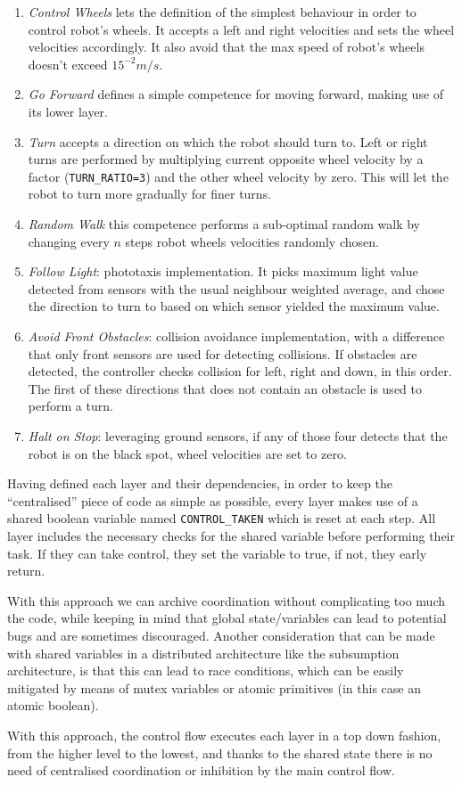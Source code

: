 \begin{enumerate}
    \item \emph{Control Wheels} lets the definition of the simplest behaviour
        in order to control robot's wheels. It accepts a left and right
        velocities and sets the wheel velocities accordingly. It also avoid
        that the max speed of robot's wheels doesn't exceed $15^{-2}m/s$.
    \item \emph{Go Forward} defines a simple competence for moving forward,
        making use of its lower layer.
    \item \emph{Turn} accepts a direction on which the robot should turn to.
        Left or right turns are performed by multiplying current opposite wheel
        velocity by a factor (\texttt{TURN\_RATIO=3}) and the other wheel velocity by zero.
        This will let the robot to turn more gradually for finer turns.
    \item \emph{Random Walk} this competence performs a sub-optimal random walk by changing
        every $n$ steps robot wheels velocities randomly chosen.
    \item \emph{Follow Light}: phototaxis implementation. It picks maximum
        light value detected from sensors with the usual neighbour weighted
        average, and chose the direction to turn to based on which sensor
        yielded the maximum value.
    \item \emph{Avoid Front Obstacles}: collision avoidance implementation,
        with a difference that only front sensors are used for detecting
        collisions. If obstacles are detected, the controller checks collision
        for left, right and down, in this order. The first of these directions
        that does not contain an obstacle is used to perform a turn.
    \item \emph{Halt on Stop}: leveraging ground sensors, if any of those four
        detects that the robot is on the black spot, wheel velocities are set
        to zero.
\end{enumerate}
Having defined each layer and their dependencies, in order to keep the
``centralised'' piece of code as simple as possible, every layer makes use of a
shared boolean variable named \texttt{CONTROL\_TAKEN} which is reset at each
step. All layer includes the necessary checks for the shared variable before
performing their task. If they can take control, they set the variable to true,
if not, they early return.

With this approach we can archive coordination without complicating too much
the code, while keeping in mind that global state/variables can lead to
potential bugs and are sometimes discouraged. Another consideration that can be
made with shared variables in a distributed architecture like the subsumption
architecture, is that this can lead to race conditions, which can be easily
mitigated by means of mutex variables or atomic primitives (in this case an
atomic boolean).

\bigskip
With this approach, the control flow executes each layer in a top down fashion,
from the higher level to the lowest, and thanks to the shared state there is no
need of centralised coordination or inhibition by the main control flow.
